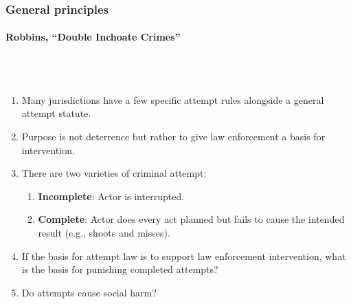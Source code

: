 \subsubsection{General principles}

\paragraph{Robbins, ``Double Inchoate Crimes''}
~\\\\
\begin{enumerate}
    \item Many jurisdictions have a few specific attempt rules alongside a 
    general attempt statute.
    \item Purpose is not deterrence but rather to give law enforcement a basis 
    for intervention.
    \item There are two varieties of criminal attempt:
    \begin{enumerate}
        \item \textbf{Incomplete}: Actor is interrupted.
        \item \textbf{Complete}: Actor does every act planned but fails to 
        cause the intended result (e.g., shoots and misses).
    \end{enumerate}
    \item If the basis for attempt law is to support law enforcement 
    intervention, what is the basis for punishing completed attempts?
    \item Do attempts cause social harm?
\end{enumerate}

